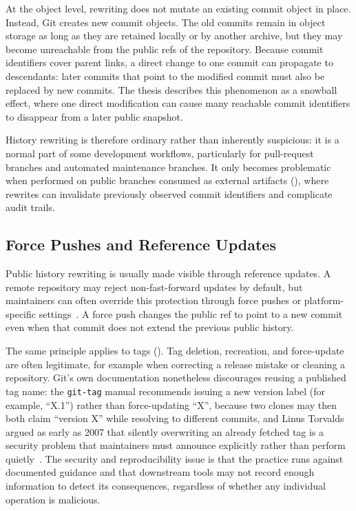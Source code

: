 At the object level, rewriting does not mutate an existing commit object in place.
Instead, Git creates new commit objects.
The old commits remain in object storage as long as they are retained locally or by another archive, but they may become unreachable from the public refs of the repository.
Because commit identifiers cover parent links, a direct change to one commit can propagate to descendants: later commits that point to the modified commit must also be replaced by new commits.
The thesis describes this phenomenon as a snowball effect, where one direct modification can cause many reachable commit identifiers to disappear from a later public snapshot.

History rewriting is therefore ordinary rather than inherently suspicious: it is a normal part of some development workflows, particularly for pull-request branches and automated maintenance branches.
It only becomes problematic when performed on public branches consumed as external artifacts (), where rewrites can invalidate previously observed commit identifiers and complicate audit trails.

\subsection{Force Pushes and Reference Updates}
\label{subsec:bg-force-pushes-reference-updates}

Public history rewriting is usually made visible through reference updates.
A remote repository may reject non-fast-forward updates by default, but maintainers can often override this protection through force pushes or platform-specific settings~\cite{ProGit2014}.
A force push changes the public ref to point to a new commit even when that commit does not extend the previous public history.

The same principle applies to tags ().
Tag deletion, recreation, and force-update are often legitimate, for example when correcting a release mistake or cleaning a repository.
Git's own documentation nonetheless discourages reusing a published tag name: the \texttt{git-tag} manual recommends issuing a new version label (for example, ``X.1'') rather than force-updating ``X'', because two clones may then both claim ``version X'' while resolving to different commits, and Linus Torvalds argued as early as 2007 that silently overwriting an already fetched tag is a security problem that maintainers must announce explicitly rather than perform quietly~\cite{git_tag_retagging_docs,torvalds_retagging_2007}.
The security and reproducibility issue is that the practice runs against documented guidance and that downstream tools may not record enough information to detect its consequences, regardless of whether any individual operation is malicious.

